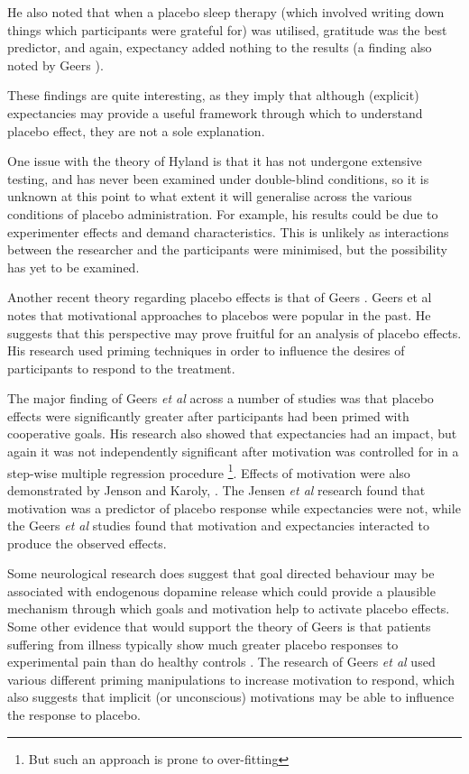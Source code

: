 He also noted that when a placebo sleep therapy (which involved writing down things which participants were grateful for) was utilised, gratitude was the best predictor, and again, expectancy added nothing to the results (a finding also noted by Geers \cite{Geers2005}). 

These findings are quite interesting, as they imply that although (explicit) expectancies may provide a useful framework through which to understand placebo effect, they are not a sole explanation. 


One issue with the theory of Hyland is that it has not undergone extensive testing, and has never been examined under double-blind conditions, so it is unknown at this point to what extent it will generalise across the various conditions of placebo administration. For example, his results could be due to experimenter effects and demand characteristics. This is  unlikely as interactions between the researcher and the participants were minimised, but the possibility has yet to be examined. 

Another recent theory regarding placebo effects is that of Geers \cite{Geers2005a}. Geers et al notes that  motivational approaches to placebos were popular in the past.  He suggests that this perspective may prove fruitful for an analysis of placebo effects.   His research used priming techniques in order to influence the desires of  participants to respond to the treatment. 

The major finding of Geers \textit{et al} across a number of studies \cite{Geers2007,Geers2005a} was that placebo effects were significantly greater after participants had been primed with cooperative goals. His research also showed that expectancies had an impact, but again it was not independently significant after motivation was controlled for in a step-wise multiple regression procedure \footnote{But such an approach is prone to over-fitting}. Effects of motivation were also demonstrated by Jenson and Karoly, \cite{Jensen1991}. The Jensen \textit{et al }   research found that motivation was a predictor of placebo response while expectancies were not, while the Geers \textit{et al } studies found that motivation and expectancies interacted to produce the observed effects.

Some neurological research does suggest that goal directed behaviour may be associated with endogenous dopamine release \cite{Scott2007a} which could provide a plausible mechanism through which  goals and motivation help to activate placebo effects. Some other evidence that would support the theory of Geers is that patients suffering from illness typically show much greater placebo responses to experimental pain than do healthy controls \cite{Klinger2007a}. The research of Geers \textit{et al } used various different priming manipulations to increase motivation to respond, which also suggests that implicit (or unconscious) motivations may be able to influence the response to placebo. 

